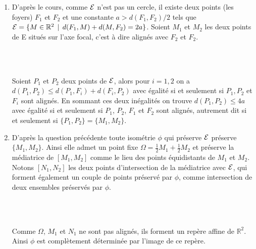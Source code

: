 \documentclass[a4paper,12pt,reqno]{amsart}
\begin{document}
\begin{solution}
  \begin{enumerate}
    \item
    \begin{minipage}[t]{.77\linewidth}
      D'après le cours, comme $\mathcal{E}$ n'est pas un cercle, il existe deux points (les foyers) $F_{1}$ et $F_{2}$ et une constante $a > d(F_{1},F_{2})/2$ tels que $\mathcal{E} = \{M \in \mathbb{R}^{2}\,\mid\, d(F_{1},M) + d(M,F_{2}) = 2a\}$. Soient $M_{1}$ et $M_{2}$ les deux points de E situés sur l'axe focal, c'est à dire alignés avec $F_{2}$ et $F_{2}$.
    \end{minipage}\hfill
    \begin{minipage}[t]{.21\linewidth}~\\[14mm]
      \hspace*{\fill}
      \smash{\scalebox{.7}{}}
    \end{minipage}\\[3mm]
    Soient $P_1$ et $P_2$ deux  points de $\mathcal{E}$, alors pour $i=1,2$ on a $d(P_{1},P_{2}) \leq d(P_{1},F_{i}) + d(F_{i},P_{2})$ avec égalité si et seulement si $P_{1}, P_{2}$ et $F_{i}$ sont alignés. En sommant ces deux inégalités on trouve $d(P_{1},P_{2}) \leq 4a$ avec égalité si et seulement si $P_{1}$, $ P_{2}$, $F_{1}$ et $F_{2}$  sont alignés, autrement dit si et seulement si $\{P_{1},P_{2}\} = \{M_{1},M_{2}\}$.
    \item
    \begin{minipage}[t]{.77\linewidth}
      D'après la question précédente toute isométrie $\phi$ qui préserve $\mathcal{E}$ préserve $\{M_{1},M_{2}\}$. Ainsi elle admet un point fixe $\Omega = \frac{1}{2} M_{1} + \frac{1}{2} M_{2}$ et préserve la médiatrice de $[M_{1},M_{2}]$ comme le lieu des points équidistants de $M_{1}$ et $M_{2}$. Notons $[N_{1},N_{2}]$ les deux points d'intersection de la médiatrice avec $\mathcal{E}$, qui forment également un couple de points préservé par $\phi$, comme intersection de deux ensembles préservés par $\phi$.
    \end{minipage}\hfill
    \begin{minipage}[t]{.21\linewidth}~\\[21mm]
      \hspace*{\fill}
      \smash{\scalebox{.7}{}}
    \end{minipage}\\[2.1mm]
    Comme $\Omega$, $M_{1}$ et $N_{1}$ ne sont pas alignés, ils forment un repère affine de $\mathbb{R}^{2}$. Ainsi $\phi$ est complètement déterminée par l'image de ce repère.\\

\end{enumerate}
\end{solution}
\end{document}
